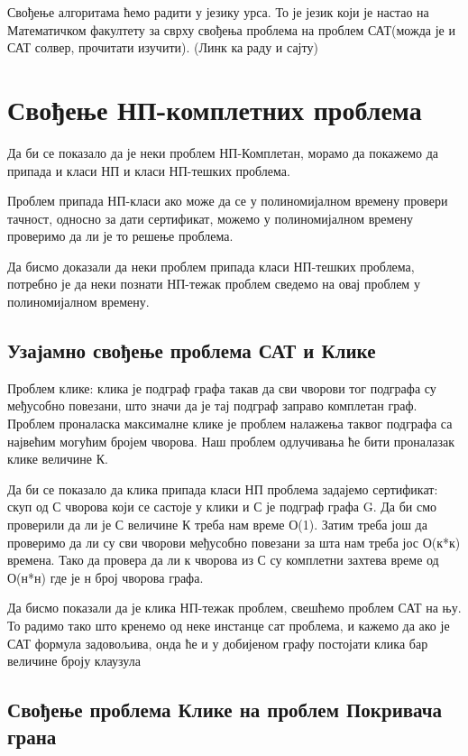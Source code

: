 \documentclass[12pt,oneside]{memoir}
\begin{document}
Свођење алгоритама ћемо радити у језику урса. То је језик који је настао на Математичком факултету за сврху свођења проблема на проблем САТ(можда је и САТ солвер, прочитати изучити). (Линк ка раду и сајту)

\section{Свођење НП-комплетних проблема}

Да би се показало да је неки проблем НП-Комплетан, морамо да покажемо да припада и класи НП и класи НП-тешких проблема. 

Проблем припада НП-класи ако може да се у  полиномијалном времену провери тачност, односно за дати сертификат, можемо у полиномијалном времену проверимо да ли је то решење проблема.

Да бисмо доказали да неки проблем припада класи НП-тешких проблема, потребно је да неки познати НП-тежак проблем сведемо на овај проблем у полиномијалном времену.

\subsection{Узајамно свођење проблема САТ и Клике}
Проблем клике:
клика је подграф графа такав да сви чворови тог подграфа су међусобно повезани, што значи да је тај подграф заправо комплетан граф. Проблем проналаска максималне клике је проблем налажења таквог подграфа са највећим могућим бројем чворова. Наш проблем одлучивања ће бити проналазак клике величине К.

Да би се показало да клика припада класи НП проблема задајемо сертификат: скуп од С чворова који се састоје у клики и С је подграф графа G.
Да би смо проверили да ли је С величине К треба нам време О(1). Затим треба још да проверимо да ли су сви чворови међусобно повезани за шта нам треба јос О(к*к) времена. Тако да провера да ли к чворова из С су комплетни захтева време од О(н*н) где је н број чворова графа.

Да бисмо показали да је клика НП-тежак проблем, свешћемо проблем САТ на њу. То радимо тако што кренемо од неке инстанце сат проблема, и кажемо да ако је САТ формула задовољива, онда ће и у добијеном графу постојати клика бар величине броју клаузула


\subsection{Свођење проблема Клике на проблем Покривача грана}
\end{document}
